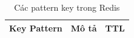 \documentclass[12pt,a4paper]{article}
\begin{document}
\begin{longtable}{|>{\raggedright\arraybackslash}p{5.5cm}|>{\raggedright\arraybackslash}p{7cm}|>{\raggedright\arraybackslash}p{3cm}|}
    \caption{Các pattern key trong Redis}                                                                                                                                                                                                                                                     \\
    \hline
    \rowcolor{headerblue}
    \textbf{Key Pattern}                                                                                                               & \textbf{Mô tả}                                                                                                    & \textbf{TTL}                     \\
    \hline
    \endhead


\end{longtable}
\end{document}
